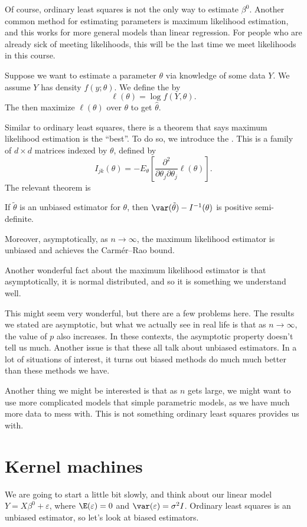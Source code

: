 \documentclass[a4paper]{article}
\begin{document}
Of course, ordinary least squares is not the only way to estimate $\beta^0$. Another common method for estimating parameters is maximum likelihood estimation, and this works for more general models than linear regression. For people who are already sick of meeting likelihoods, this will be the last time we meet likelihoods in this course.

Suppose we want to estimate a parameter $\theta$ via knowledge of some data $Y$. We assume $Y$ has density $f(y; \theta)$. We define the  by
\[
  \ell(\theta) = \log f(Y, \theta).
\]
The  then maximize $\ell(\theta)$ over $\theta$ to get $\hat{\theta}$.

Similar to ordinary least squares, there is a theorem that says maximum likelihood estimation is the ``best''. To do so, we introduce the . This is a family of $d \times d$ matrices indexed by $\theta$, defined by
\[
  I_{jk}(\theta) = - E_\theta\left[\frac{\partial^2}{\partial \theta_j \partial \theta_j} \ell(\theta)\right].
\]
The relevant theorem is
\begin{thm}
  If $\tilde{\theta}$ is an unbiased estimator for $\theta$, then $\var(\tilde{\theta}) - I^{-1}(\theta)$ is positive semi-definite.

  Moreover, asymptotically, as $n \to \infty$, the maximum likelihood estimator is unbiased and achieves the Carm\'er--Rao bound.
\end{thm}

Another wonderful fact about the maximum likelihood estimator is that asymptotically, it is normal distributed, and so it is something we understand well.

This might seem very wonderful, but there are a few problems here. The results we stated are asymptotic, but what we actually see in real life is that as $n \to \infty$, the value of $p$ also increases. In these contexts, the asymptotic property doesn't tell us much. Another issue is that these all talk about unbiased estimators. In a lot of situations of interest, it turns out biased methods do much much better than these methods we have.

Another thing we might be interested is that as $n$ gets large, we might want to use more complicated models that simple parametric models, as we have much more data to mess with. This is not something ordinary least squares provides us with.

\section{Kernel machines}
We are going to start a little bit slowly, and think about our linear model $Y = X\beta^0 + \varepsilon$, where $\E(\varepsilon) = 0$ and $\var(\varepsilon) = \sigma^2 I$. Ordinary least squares is an unbiased estimator, so let's look at biased estimators.
\end{document}
